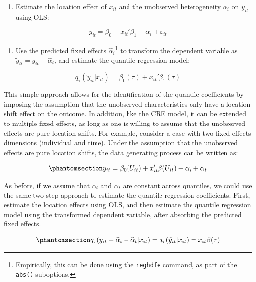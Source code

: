 \documentclass[bib]{statapress}
\providecommand{\tightlist}{%
  \setlength{\itemsep}{0pt}\setlength{\parskip}{0pt}}\usepackage{longtable,booktabs,array}
\begin{document}
\begin{enumerate}
\def\labelenumi{\arabic{enumi}.}
\tightlist
\item
  Estimate the location effect of \(x_{it}\) and the unobserved
  heterogeneity \(\alpha_i\) on \(y_{it}\) using OLS:
\end{enumerate}

\[y_{it}=\beta_0 +  x_{it}' \beta_1   +\alpha_i + \varepsilon_{it}
\]

\begin{enumerate}
\def\labelenumi{\arabic{enumi}.}
\setcounter{enumi}{1}
\tightlist
\item
  Use the predicted fixed effects \(\hat\alpha_i\)\footnote{Empirically,
    this can be done using the \texttt{reghdfe} command, as part of the
    \texttt{abs()} suboptions.} to transform the dependent variable as
  \(\tilde y_{it}=y_{it}-\hat\alpha_i\), and estimate the quantile
  regression model:
\end{enumerate}

\[q_{\tau}(\tilde y_{it}|x_{it}) = \beta_0(\tau)+x_{it}'\beta_1(\tau)
\]

This simple approach allows for the identification of the quantile
coefficients by imposing the assumption that the unobserved
characteristics only have a location shift effect on the outcome. In
addition, like the CRE model, it can be extended to multiple fixed
effects, as long as one is willing to assume that the unobserved effects
are pure location shifts. For example, consider a case with two fixed
effects dimensions (individual and time). Under the assumption that the
unobserved effects are pure location shifts, the data generating process
can be written as:

\begin{equation}\phantomsection\label{eq-canay-dgp-2way}{y_{it} = \beta_0(U_{it}) + x_{it}'\beta(U_{it}) + \alpha_i + \alpha_t
}\end{equation}

As before, if we assume that \(\alpha_i\) and \(\alpha_t\) are constant
across quantiles, we could use the same two-step approach to estimate
the quantile regression coefficients. First, estimate the location
effects using OLS, and then estimate the quantile regression model using
the transformed dependent variable, after absorbing the predicted fixed
effects.

\begin{equation}\phantomsection\label{eq-canay-mway}{q_{\tau}(y_{it}-\hat \alpha_i - \hat \alpha_t|x_{it})=q_{\tau}(\tilde y_{it}|x_{it}) = x_{it}\beta(\tau)
}\end{equation}
\end{document}

